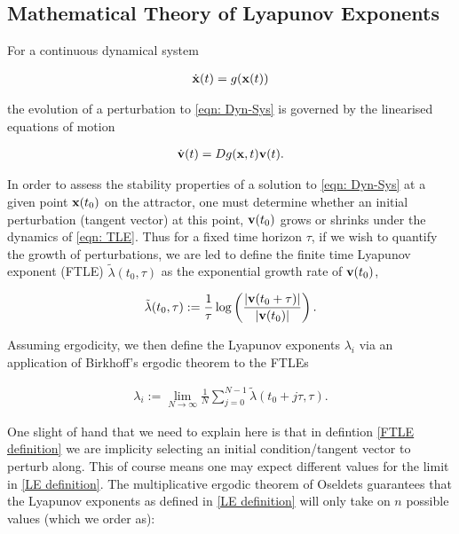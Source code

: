 \subsection{Mathematical Theory of Lyapunov Exponents} \label{subsection: LE Basics}

For a continuous dynamical system

\begin{align}
\dot{\vb{x}}(t) = g(\vb{x}(t)) \label{eqn: Dyn-Sys}
\end{align}

the evolution of a perturbation to \ref{eqn: Dyn-Sys} is governed by the linearised equations of motion

\begin{align}
\dot{\vb{v}}(t) = Dg(\vb{x}, t)\vb{v}(t) \label{eqn: TLE}.
\end{align}

In order to assess the stability properties of a solution to \ref{eqn: Dyn-Sys} at a given point $\vb{x}(t_0)$ on the attractor, one must determine whether an initial perturbation (tangent vector) at this point, $\vb{v}(t_0)$ grows or shrinks under the dynamics of \ref{eqn: TLE}. Thus for a fixed time horizon $\tau$, if we wish to quantify the growth of perturbations, we are led to define the finite time Lyapunov exponent (FTLE) $\tilde{\lambda}(t_0, \tau)$ as the exponential growth rate of $\vb{v}(t_0)$,

\begin{align}
\tilde{\lambda}(t_0, \tau) := \frac{1}{\tau} \log \left( {\frac{|\vb{v}(t_0 + \tau)|}{|\vb{v}(t_0)|}} \right). \label{FTLE definition}
\end{align}

Assuming ergodicity, we then define the Lyapunov exponents $\lambda_i$ via an application of Birkhoff's ergodic theorem \cite{Petersen1989} to the FTLEs

\begin{align}
    \lambda_i := \lim_{N \to \infty} \frac{1}{N} \sum_{j = 0} ^ {N-1} \tilde{\lambda}(t_0 + j \tau, \tau). \label{LE definition}
\end{align}

One slight of hand that we need to explain here is that in defintion \ref{FTLE definition} we are implicity selecting an initial condition/tangent vector to perturb along. This of course means one may expect different values for the limit in \ref{LE definition}. The multiplicative ergodic theorem of Oseldets \cite{Oseledets1968} guarantees that the Lyapunov exponents as defined in \ref{LE definition} will only take on $n$ possible values (which we order as):

